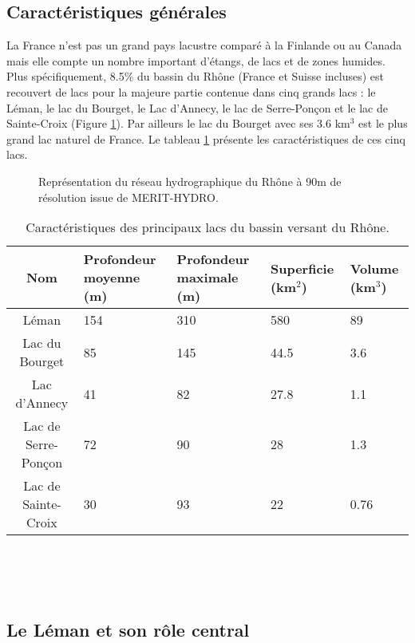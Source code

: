 \subsection{{\selectfont Caractéristiques générales}}
La France n'est pas un grand pays lacustre comparé à la Finlande ou au Canada mais elle compte un nombre important d'étangs, de lacs et de zones humides. Plus spécifiquement, 8.5\% du bassin du Rhône (France et Suisse incluses) est recouvert de lacs pour la majeure partie contenue dans cinq grands lacs \citep{olivier2009}: le Léman,  le lac du Bourget, le Lac d'Annecy, le lac de Serre-Ponçon et le lac de Sainte-Croix (Figure \ref{reseau_hydro_rhone}). Par ailleurs le lac du Bourget avec ses 3.6 km$^{3}$ est le plus grand lac naturel de France. Le tableau \ref{tab:lacs_rhone} présente les caractéristiques de ces cinq lacs.\\

\begin{figure}[h!]
     \hfill
     \hfill
     \caption{Représentation du réseau hydrographique du Rhône à 90m de résolution issue de MERIT-HYDRO.}
     \label{reseau_hydro_rhone}
\end{figure}

\begin{table}[h!]
 \caption{Caractéristiques des principaux lacs du bassin versant du Rhône.}
 \label{tab:lacs_rhone}
 \begin{tabularx}{\textwidth}{cXXXX}
 \hline
 Nom& Profondeur moyenne (m) & Profondeur maximale (m) & Superficie (km$^{2}$)& Volume (km$^{3}$)\\
 \hline
  Léman&154&310&580&89\\
  Lac du Bourget &85&145&44.5&3.6\\
  Lac d'Annecy &41&82&27.8&1.1\\
  Lac de Serre-Ponçon&72&90&28&1.3\\ 
  Lac de Sainte-Croix &30&93&22&0.76\\
  \hline
 \end{tabularx}
\end{table}

~\\
~\\
~\\
\subsection{{\selectfont Le Léman et son rôle central}}
\label{sec:leman}

